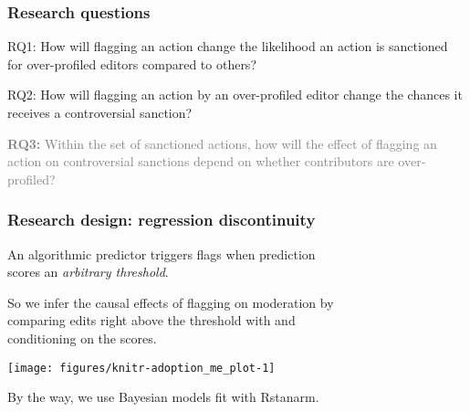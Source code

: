 \documentclass[10pt,xcolor=dvipsnames,aspectratio=169]{beamer}\usepackage[]{graphicx}\usepackage[]{color}
\newenvironment{knitrout}{}{} %
\newcommand{\e}[1]{\alert{#1}}
\begin{document}
\begin{frame}\frametitle{Research questions}
\vspace{7em}
\larger

  \e{RQ1:} How will flagging an action change the likelihood an action is sanctioned for over-profiled editors compared to others?

  \e{RQ2:} How will flagging an action by an over-profiled editor change the chances it receives a controversial sanction?

\textcolor{gray}{\textbf{RQ3:} Within the set of sanctioned actions, how will the effect of flagging an action on controversial sanctions depend on whether contributors are over-profiled?}

\end{frame}

\begin{frame}\frametitle{Research design: regression discontinuity}

\larger

An algorithmic predictor triggers flags when prediction \\
scores an \emph{arbitrary threshold}.

  So we infer the causal effects of flagging on moderation by \\ comparing edits right above the threshold with and  \\ conditioning  on the scores.

\begin{minipage}{0.45\textwidth}
\begin{knitrout}
\color{fgcolor}
\texttt{[image: figures/knitr-adoption\_me\_plot-1]} 

\end{knitrout}
\end{minipage}
\hfill
\begin{minipage}{0.45\textwidth}
By the way, we use Bayesian models fit with Rstanarm. 

\end{minipage}

\end{frame}
\end{document}
